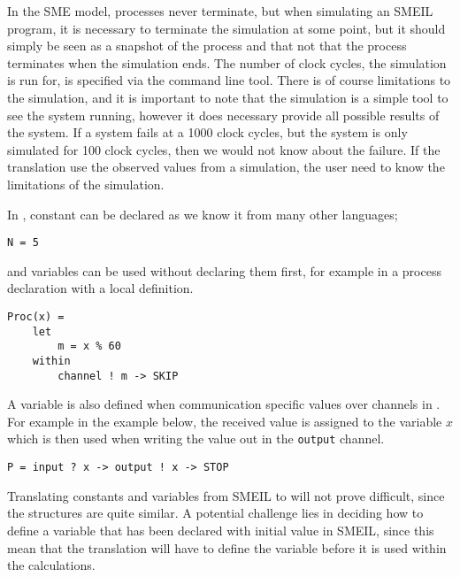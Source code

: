In the SME model, processes never terminate, but when simulating an SMEIL program, it is necessary to terminate the simulation at some point, but it should simply be seen as a snapshot of the process and that not that the process terminates when the simulation ends.
The number of clock cycles, the simulation is run for, is specified via the command line tool.
There is of course limitations to the simulation, and it is important to note that the simulation is a simple tool to see the system running, however it does necessary provide all possible results of the system. If a system fails at a 1000 clock cycles, but the system is only simulated for 100 clock cycles, then we would not know about the failure. If the translation use the observed values from a simulation, the user need to know the limitations of the simulation.

In \cspm, constant can be declared as we know it from many other languages;
\begin{verbatim}
N = 5
\end{verbatim}
and variables can be used without declaring them first, for example in a process declaration with a local definition.
\begin{verbatim}
Proc(x) =
    let
        m = x % 60
    within
        channel ! m -> SKIP
\end{verbatim}
A variable is also defined when communication specific values over channels in \cspm. For example in the example below, the received value is assigned to the variable $x$ which is then used when writing the value out in the \texttt{output} channel.
\begin{verbatim}
P = input ? x -> output ! x -> STOP
\end{verbatim}

Translating constants and variables from SMEIL to \cspm will not prove difficult, since the structures are quite similar.
A potential challenge lies in deciding how to define a variable that has been declared with initial value in SMEIL, since this mean that the \cspm translation will have to define the variable before it is used within the calculations.
